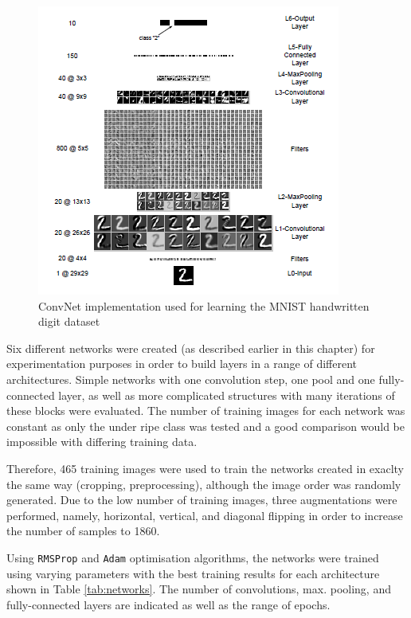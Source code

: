 \documentclass[fleqn,twoside,12pt]{report}
\begin{document}
\begin{figure}[h]
	\centering
	\includegraphics[width=0.7\linewidth]{convnet2.png}
	\caption{ ConvNet implementation used for learning the MNIST handwritten digit dataset}
	\label{fig:convnet2}
\end{figure}%
	

Six different networks were created (as described earlier in this chapter) for experimentation purposes in order to build layers in a range of different architectures. Simple networks with one convolution step, one pool and one fully-connected layer, as well as more complicated structures with many iterations of these blocks were evaluated. The number of training images for each network was constant as only the under ripe class was tested and a good comparison would be impossible with differing training data.


Therefore, 465 training images were used to train the networks created in exaclty the same way (cropping, preprocessing), although the image order was randomly generated. Due to the low number of training images, three augmentations were performed, namely, horizontal, vertical, and diagonal flipping in order to increase the number of samples to 1860. 

Using \texttt{RMSProp} and \texttt{Adam} optimisation algorithms, the networks were trained using varying parameters with the best training results for each architecture shown in Table \ref{tab:networks}. The number of convolutions, max. pooling, and fully-connected layers are indicated as well as the range of epochs.
\end{document}

